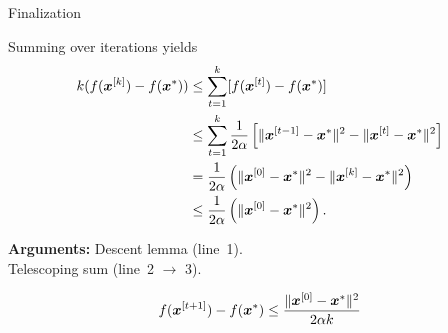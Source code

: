 \documentclass[11pt,compress,t,notes=noshow, xcolor=table]{beamer}
\begin{document}
\begin{framei}{Finalization}
\item Summing over iterations yields
\begin{align*}
k ( f(\bm{x}^{[k]}) - f(\bm{x}^\ast)) &\leq \sum_{t=1}^{k} [f(\bm{x}^{[t]}) - f(\bm{x}^\ast)]\\
&\leq \sum_{t=1}^{k} \frac{1}{2 \alpha} \left[ \|\bm{x}^{[t-1]}-\bm{x}^\ast\|^2 - \| \bm{x}^{[t]} - \bm{x}^\ast \|^2 \right] \\
&= \frac{1}{2 \alpha}  \left( \|\bm{x}^{[0]}-\bm{x}^\ast\|^2 - \| \bm{x}^{[k]} - \bm{x}^\ast \|^2 \right) \\
&\leq \frac{1}{2 \alpha} \left( \|\bm{x}^{[0]}-\bm{x}^\ast\|^2 \right).
\end{align*}
\item\textbf{Arguments:} Descent lemma (line~1).\\ Telescoping sum (line~2 $\to$ 3).
\begin{framed}
$$f(\bm{x}^{[t+1]}) - f(\bm{x}^\ast) \leq \frac{\| \bm{x}^{[0]} - \bm{x}^\ast \|^2}{2\alpha k}$$
\end{framed}
\end{framei}

\endlecture
\end{document}
